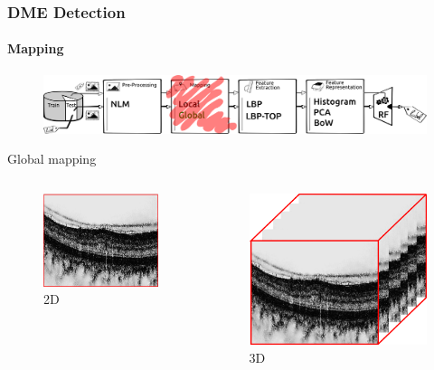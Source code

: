 \documentclass{beamer}
\begin{document}
\begin{frame}
  \frametitle{DME Detection}
  \framesubtitle{Mapping}
  \begin{figure}
    \centering
    \includegraphics[width=.5\textwidth]{./images/ml-map2.png}
  \end{figure}
  \begin{block}{Global mapping}
    \begin{columns}
      \begin{column}{.5\linewidth}
        \begin{figure}
          \centering
          \includegraphics[width=.3\textwidth]{./images/global-2d.png}
          \caption{2D}
        \end{figure}
      \end{column}
      \begin{column}{.5\linewidth}
        \begin{figure}
          \centering
          \includegraphics[width=.3\textwidth]{./images/global-3d.png}
          \caption{3D}
        \end{figure}
      \end{column}
    \end{columns}
  \end{block}
\end{frame}
\end{document}
